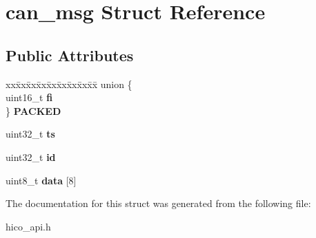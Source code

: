 \hypertarget{structcan__msg}{}\section{can\+\_\+msg Struct Reference}
\label{structcan__msg}
\subsection*{Public Attributes}
\begin{DoxyCompactItemize}
\item 
\mbox{\label{structcan__msg_a7c71c42eb743dfd9832d38575cfbcc83}} 
\begin{tabbing}
xx\=xx\=xx\=xx\=xx\=xx\=xx\=xx\=xx\=\kill
union \{\\
\>uint16\_t {\bfseries fi}\\
\} {\bfseries PACKED}\\

\end{tabbing}\item 
\mbox{\label{structcan__msg_a157aaad2daf039f59606522c6a51663a}} 
uint32\+\_\+t {\bfseries ts}
\item 
\mbox{\label{structcan__msg_a9a5f820883d3dfe1f0c6bc33c3f95989}} 
uint32\+\_\+t {\bfseries id}
\item 
\mbox{\label{structcan__msg_a6b8246516689e59dbd52e472e28dd8a3}} 
uint8\+\_\+t {\bfseries data} \mbox{[}8\mbox{]}
\end{DoxyCompactItemize}


The documentation for this struct was generated from the following file\+:\begin{DoxyCompactItemize}
\item 
hico\+\_\+api.\+h\end{DoxyCompactItemize}
